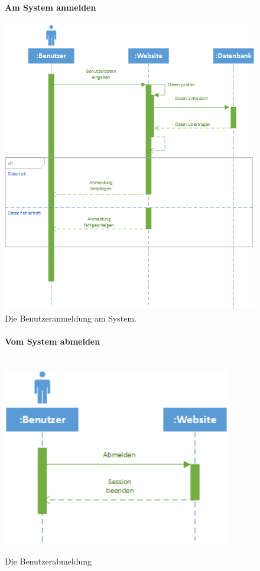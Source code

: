 \documentclass[12pt,a4paper]{article}
\begin{document}
\begin{figure}[H]
	\centering
	\paragraph{Am System anmelden}
	\includegraphics[width=\textwidth]{Bilder/Sequenzdiagramme/AmSystemAnmelden.png}
	\caption{Die Benutzeranmeldung am System.}
	\label{SzAmSystemAnmelden}
\end{figure}
\begin{figure}[H]
	\centering
	\paragraph{Vom System abmelden}\mbox{}\\
	\includegraphics[width=10cm]{Bilder/Sequenzdiagramme/VomSystemAbmelden.png}
	\caption{Die Benutzerabmeldung}
	\label{SzVomSystemAbmelden}
\end{figure}
\end{document}
